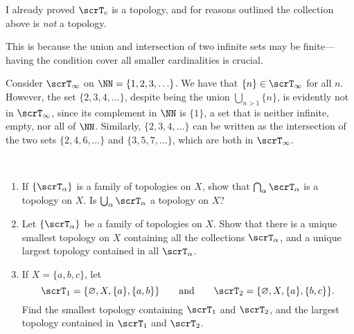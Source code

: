 \documentclass{article}
\begin{document}
I already proved $\scrT_c$ is a topology, and for reasons outlined the collection above is \textit{not} a topology.

This is because the union and intersection of two infinite sets may be finite--- having the condition cover all smaller cardinalities is crucial.

Consider $\scrT_\infty$ on $\NN = \{1,2,3,\ldots\}$.
We have that $\{n\} \in \scrT_\infty$ for all $n$.
However, the set $\{2,3,4,\ldots\}$, despite being the union $\bigcup_{n>1}\{n\}$, is evidently not in $\scrT_\infty$, since its complement in $\NN$ is $\{1\}$, a set that is neither infinite, empty, nor all of $\NN$.
Similarly, $\{2,3,4,\ldots\}$ can be written as the intersection of the two sets $\{2,4,6,\ldots\}$ and $\{3,5,7,\ldots\}$, which are both in $\scrT_\infty$.

\begin{exercise}\
    \begin{enumerate}[label=(\alph*)]
        \item 
            If $\{\scrT_\alpha\}$ is a family of topologies on $X$, show that $\bigcap_\alpha \scrT_\alpha$ is a topology on $X$.
            Is $\bigcup_\alpha \scrT_\alpha$ a topology on $X$?
        \item
            Let $\{\scrT_\alpha\}$ be a family of topologies on $X$.
            Show that there is a unique smallest topology on $X$ containing all the collections $\scrT_\alpha$, and a unique largest topology contained in all $\scrT_\alpha$.
        \item 
            If $X = \{a,b,c\}$, let
            \[
                \scrT_1 = \{\varnothing, X, \{a\},\{a,b\}\} \qquad \text{and} \qquad \scrT_2 = \{\varnothing, X, \{a\}, \{b, c\}\}.
            \]
            Find the smallest topology containing $\scrT_1$ and $\scrT_2$, and the largest topology contained in $\scrT_1$ and $\scrT_2$.
    \end{enumerate}
\end{exercise}
\end{document}
